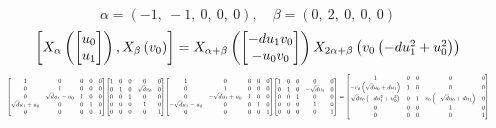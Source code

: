 \documentclass[11pt]{article}
\theoremstyle{definition}
\begin{document}
\[
\alpha = \left( -1, \  -1, \  0, \  0, \  0\right), \quad \beta = \left( 0, \  2, \  0, \  0, \  0\right)
\]
\[
\scaletoalign{\textwidth}{\left[ X_{\alpha}\left(\left[\begin{matrix}u_{0}\\u_{1}\end{matrix}\right]\right), X_{\beta}\left(v_{0}\right) \right] = X_{\alpha + \beta}\left(\left[\begin{matrix}- d u_{1} v_{0}\\- u_{0} v_{0}\end{matrix}\right]\right) X_{2\alpha + \beta}\left(v_{0} \left(- d u_{1}^{2} + u_{0}^{2}\right)\right)}
\]
\[
\scaletoalign{\textwidth}{{\left[\begin{matrix}1 & 0 & 0 & 0 & 0\\0 & 1 & 0 & 0 & 0\\0 & \sqrt{d} u_{1} - u_{0} & 1 & 0 & 0\\\sqrt{d} u_{1} + u_{0} & 0 & 0 & 1 & 0\\0 & 0 & 0 & 0 & 1\end{matrix}\right]} {\left[\begin{matrix}1 & 0 & 0 & 0 & 0\\0 & 1 & 0 & \sqrt{d} v_{0} & 0\\0 & 0 & 1 & 0 & 0\\0 & 0 & 0 & 1 & 0\\0 & 0 & 0 & 0 & 1\end{matrix}\right]} {\left[\begin{matrix}1 & 0 & 0 & 0 & 0\\0 & 1 & 0 & 0 & 0\\0 & - \sqrt{d} u_{1} + u_{0} & 1 & 0 & 0\\- \sqrt{d} u_{1} - u_{0} & 0 & 0 & 1 & 0\\0 & 0 & 0 & 0 & 1\end{matrix}\right]} {\left[\begin{matrix}1 & 0 & 0 & 0 & 0\\0 & 1 & 0 & - \sqrt{d} v_{0} & 0\\0 & 0 & 1 & 0 & 0\\0 & 0 & 0 & 1 & 0\\0 & 0 & 0 & 0 & 1\end{matrix}\right]} = {\left[\begin{matrix}1 & 0 & 0 & 0 & 0\\- v_{0} \left(\sqrt{d} u_{0} + d u_{1}\right) & 1 & 0 & 0 & 0\\\sqrt{d} v_{0} \left(- d u_{1}^{2} + u_{0}^{2}\right) & 0 & 1 & v_{0} \left(- \sqrt{d} u_{0} + d u_{1}\right) & 0\\0 & 0 & 0 & 1 & 0\\0 & 0 & 0 & 0 & 1\end{matrix}\right]}}
\]
\end{document}
